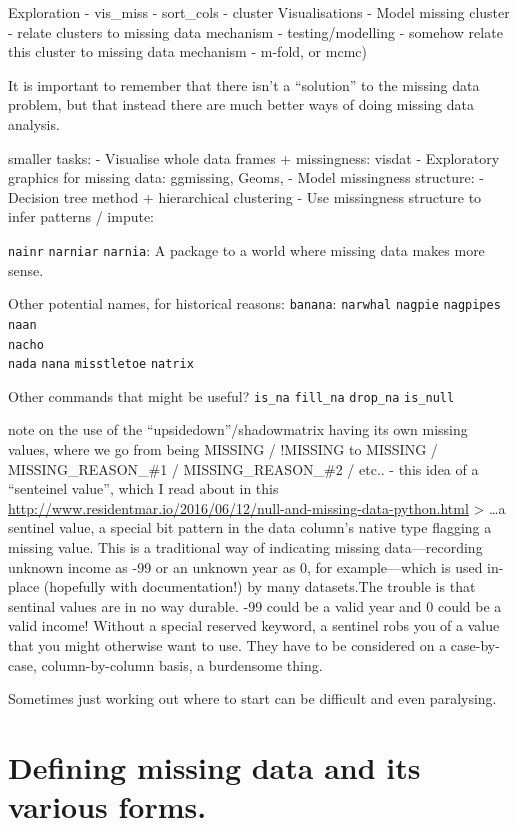 \documentclass[]{article}
\begin{document}
Exploration - vis\_miss - sort\_cols - cluster Visualisations - Model
missing cluster - relate clusters to missing data mechanism -
testing/modelling - somehow relate this cluster to missing data
mechanism - m-fold, or mcmc)

It is important to remember that there isn't a ``solution'' to the
missing data problem, but that instead there are much better ways of
doing missing data analysis.

smaller tasks: - Visualise whole data frames + missingness: visdat -
Exploratory graphics for missing data: ggmissing, Geoms, - Model
missingness structure: - Decision tree method + hierarchical clustering
- Use missingness structure to infer patterns / impute:

\texttt{nainr} \texttt{narniar} \texttt{narnia}: A package to a world
where missing data makes more sense.

Other potential names, for historical reasons: \texttt{banana}:
\texttt{narwhal} \texttt{nagpie} \texttt{nagpipes} \texttt{naan}\\
\texttt{nacho}\\
\texttt{nada} \texttt{nana} \texttt{misstletoe} \texttt{natrix}

Other commands that might be useful? \texttt{is\_na} \texttt{fill\_na}
\texttt{drop\_na} \texttt{is\_null}

note on the use of the ``upsidedown''/shadowmatrix having its own
missing values, where we go from being MISSING / !MISSING to MISSING /
MISSING\_REASON\_\#1 / MISSING\_REASON\_\#2 / etc.. - this idea of a
``senteinel value'', which I read about in this
\href{blog\%20post}{http://www.residentmar.io/2016/06/12/null-and-missing-data-python.html}
\textgreater{} \ldots{}a sentinel value, a special bit pattern in the
data column's native type flagging a missing value. This is a
traditional way of indicating missing data---recording unknown income as
-99 or an unknown year as 0, for example---which is used in-place
(hopefully with documentation!) by many datasets.The trouble is that
sentinal values are in no way durable. -99 could be a valid year and 0
could be a valid income! Without a special reserved keyword, a sentinel
robs you of a value that you might otherwise want to use. They have to
be considered on a case-by-case, column-by-column basis, a burdensome
thing.

Sometimes just working out where to start can be difficult and even
paralysing.

\section{Defining missing data and its various
forms.}\label{defining-missing-data-and-its-various-forms.}
\end{document}
